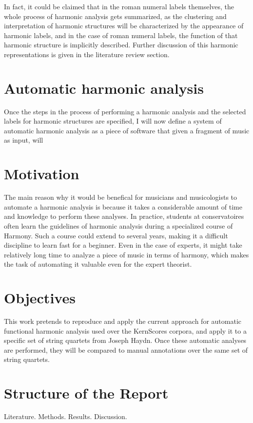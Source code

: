 In fact, it could be claimed that in the roman numeral labels themselves, the whole process of harmonic analysis gets summarized, as the clustering and interpretation of harmonic structures will be characterized by the appearance of harmonic labels, and in the case of roman numeral labels, the function of that harmonic structure is implicitly described. Further discussion of this harmonic representations is given in the literature review section.

\section{Automatic harmonic analysis}
Once the steps in the process of performing a harmonic analysis and the selected labels for harmonic structures are specified, I will now define a system of automatic harmonic analysis as a piece of software that given a fragment of music as input, will

\section{Motivation}
The main reason why it would be benefical for musicians and musicologists to automate a harmonic analysis is because it takes a considerable amount of time and knowledge to perform these analyses. In practice, students at conservatoires often learn the guidelines of harmonic analysis during a specialized course of Harmony. Such a course could extend to several years, making it a difficult discipline to learn fast for a beginner. Even in the case of experts, it might take relatively long time to analyze a piece of music in terms of harmony, which makes the task of automating it valuable even for the expert theorist.

\section{Objectives}
This work pretends to reproduce and apply the current approach for automatic functional harmonic analysis used over the KernScores corpora, and apply it to a specific set of string quartets from Joseph Haydn. Once these automatic analyses are performed, they will be compared to manual annotations over the same set of string quartets.

\section{Structure of the Report}
Literature. Methods. Results. Discussion.

\newpage
